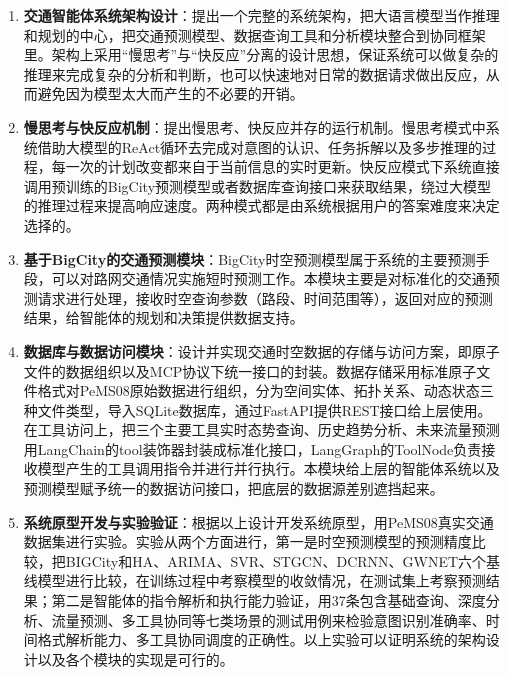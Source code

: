 \begin{enumerate}

\item \textbf{交通智能体系统架构设计}：提出一个完整的系统架构，把大语言模型当作推理和规划的中心，把交通预测模型、数据查询工具和分析模块整合到协同框架里。架构上采用“慢思考”与“快反应”分离的设计思想，保证系统可以做复杂的推理来完成复杂的分析和判断，也可以快速地对日常的数据请求做出反应，从而避免因为模型太大而产生的不必要的开销。

\item \textbf{慢思考与快反应机制}：提出慢思考、快反应并存的运行机制。慢思考模式中系统借助大模型的ReAct循环去完成对意图的认识、任务拆解以及多步推理的过程，每一次的计划改变都来自于当前信息的实时更新。快反应模式下系统直接调用预训练的BigCity预测模型或者数据库查询接口来获取结果，绕过大模型的推理过程来提高响应速度。两种模式都是由系统根据用户的答案难度来决定选择的。

\item \textbf{基于BigCity的交通预测模块}：BigCity时空预测模型属于系统的主要预测手段，可以对路网交通情况实施短时预测工作。本模块主要是对标准化的交通预测请求进行处理，接收时空查询参数（路段、时间范围等），返回对应的预测结果，给智能体的规划和决策提供数据支持。

\item \textbf{数据库与数据访问模块}：设计并实现交通时空数据的存储与访问方案，即原子文件的数据组织以及MCP协议下统一接口的封装。数据存储采用标准原子文件格式对PeMS08原始数据进行组织，分为空间实体、拓扑关系、动态状态三种文件类型，导入SQLite数据库，通过FastAPI提供REST接口给上层使用。在工具访问上，把三个主要工具实时态势查询、历史趋势分析、未来流量预测用LangChain的tool装饰器封装成标准化接口，LangGraph的ToolNode负责接收模型产生的工具调用指令并进行并行执行。本模块给上层的智能体系统以及预测模型赋予统一的数据访问接口，把底层的数据源差别遮挡起来。

\item \textbf{系统原型开发与实验验证}：根据以上设计开发系统原型，用PeMS08真实交通数据集进行实验。实验从两个方面进行，第一是时空预测模型的预测精度比较，把BIGCity和HA、ARIMA、SVR、STGCN、DCRNN、GWNET六个基线模型进行比较，在训练过程中考察模型的收敛情况，在测试集上考察预测结果；第二是智能体的指令解析和执行能力验证，用37条包含基础查询、深度分析、流量预测、多工具协同等七类场景的测试用例来检验意图识别准确率、时间格式解析能力、多工具协同调度的正确性。以上实验可以证明系统的架构设计以及各个模块的实现是可行的。

\end{enumerate}
